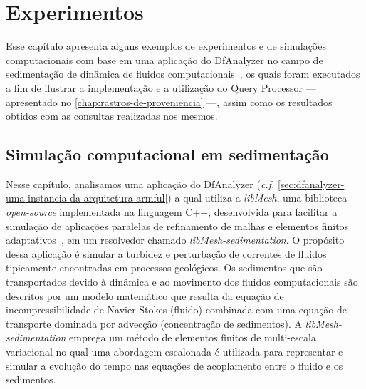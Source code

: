 

\chapter{Experimentos}%
\label{chap:experimentos}

Esse capítulo apresenta alguns exemplos de experimentos e de simulações computacionais com base em uma aplicação do DfAnalyzer no campo de sedimentação de dinâmica de fluidos computacionais~\cite{silva2016situ}, os quais foram executados a fim de ilustrar a implementação e a utilização do Query Processor --- apresentado no \autoref{chap:rastros-de-proveniencia} ---, assim como os resultados obtidos com as consultas realizadas nos mesmos.

\section{Simulação computacional em sedimentação}

Nesse capítulo, analisamos uma aplicação do DfAnalyzer (\textit{c.f.} \autoref{sec:dfanalyzer-uma-instancia-da-arquitetura-armful}) a qual utiliza a \textit{libMesh}, uma biblioteca \textit{open-source} implementada na linguagem C++, desenvolvida para facilitar a simulação de aplicações paralelas de refinamento de malhas e elementos finitos adaptativos~\cite{boncz2008breaking}, em um resolvedor chamado \textit{libMesh-sedimentation}. O propósito dessa aplicação é simular a turbidez e perturbação de correntes de fluidos tipicamente encontradas em processos geológicos. Os sedimentos que são transportados devido à dinâmica e ao movimento dos fluidos computacionais são descritos por um modelo matemático que resulta da equação de incompressibilidade de Navier-Stokes (fluido) combinada com uma equação de transporte dominada por advecção (concentração de sedimentos). A \textit{libMesh-sedimentation} emprega um método de elementos finitos de multi-escala variacional no qual uma abordagem escalonada é utilizada para representar e simular a evolução do tempo nas equações de acoplamento entre o fluido e os sedimentos. 

